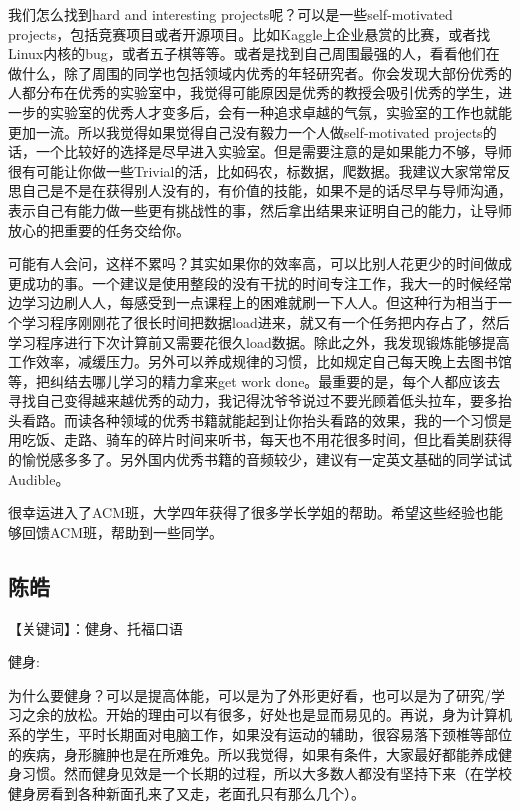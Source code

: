\documentclass{vivid_layout}
\begin{document}
我们怎么找到hard and interesting projects呢？可以是一些self-motivated projects，包括竞赛项目或者开源项目。比如Kaggle上企业悬赏的比赛，或者找Linux内核的bug，或者五子棋等等。或者是找到自己周围最强的人，看看他们在做什么，除了周围的同学也包括领域内优秀的年轻研究者。你会发现大部份优秀的人都分布在优秀的实验室中，我觉得可能原因是优秀的教授会吸引优秀的学生，进一步的实验室的优秀人才变多后，会有一种追求卓越的气氛，实验室的工作也就能更加一流。所以我觉得如果觉得自己没有毅力一个人做self-motivated projects的话，一个比较好的选择是尽早进入实验室。但是需要注意的是如果能力不够，导师很有可能让你做一些Trivial的活，比如码农，标数据，爬数据。我建议大家常常反思自己是不是在获得别人没有的，有价值的技能，如果不是的话尽早与导师沟通，表示自己有能力做一些更有挑战性的事，然后拿出结果来证明自己的能力，让导师放心的把重要的任务交给你。

可能有人会问，这样不累吗？其实如果你的效率高，可以比别人花更少的时间做成更成功的事。一个建议是使用整段的没有干扰的时间专注工作，我大一的时候经常边学习边刷人人，每感受到一点课程上的困难就刷一下人人。但这种行为相当于一个学习程序刚刚花了很长时间把数据load进来，就又有一个任务把内存占了，然后学习程序进行下次计算前又需要花很久load数据。除此之外，我发现锻炼能够提高工作效率，减缓压力。另外可以养成规律的习惯，比如规定自己每天晚上去图书馆等，把纠结去哪儿学习的精力拿来get work done。最重要的是，每个人都应该去寻找自己变得越来越优秀的动力，我记得沈爷爷说过不要光顾着低头拉车，要多抬头看路。而读各种领域的优秀书籍就能起到让你抬头看路的效果，我的一个习惯是用吃饭、走路、骑车的碎片时间来听书，每天也不用花很多时间，但比看美剧获得的愉悦感多多了。另外国内优秀书籍的音频较少，建议有一定英文基础的同学试试Audible。

很幸运进入了ACM班，大学四年获得了很多学长学姐的帮助。希望这些经验也能够回馈ACM班，帮助到一些同学。

\subsection{{ 陈皓}}

【关键词】：健身、托福口语

健身:

为什么要健身？可以是提高体能，可以是为了外形更好看，也可以是为了研究/学习之余的放松。开始的理由可以有很多，好处也是显而易见的。再说，身为计算机系的学生，平时长期面对电脑工作，如果没有运动的辅助，很容易落下颈椎等部位的疾病，身形臃肿也是在所难免。所以我觉得，如果有条件，大家最好都能养成健身习惯。然而健身见效是一个长期的过程，所以大多数人都没有坚持下来（在学校健身房看到各种新面孔来了又走，老面孔只有那么几个）。
\end{document}
